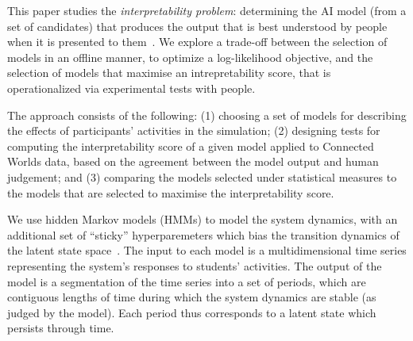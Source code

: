 \documentclass[letterpaper]{article} %
\newcommand{\kibitz}[2]{\ifnum\Comments=1{\textcolor{#1}{#2}}\fi}
\newcommand{\kg}[1]{\kibitz{red}{[KG:#1]}}
\begin{document}
This paper studies the \emph{interpretability problem}: determining the AI model (from a set of candidates) that produces the output that is  best understood by people when it is presented  to them~\cite{gilpin2018explaining,doshi2017roadmap,caruana2015intelligible}.
We explore a trade-off between the selection of models in an offline manner, to optimize a log-likelihood objective, and the selection of models that maximise an intrepretability score, that is operationalized via experimental tests with people.

The approach consists of the following:
(1) choosing a set of models for describing the effects of participants' activities in the simulation;
(2) designing tests for computing the interpretability score of a given model applied to Connected Worlds data, based on the agreement between the model output and human judgement; and
(3) comparing the models selected under statistical measures to the models that are selected to maximise the interpretability score.


We use hidden Markov models (HMMs) to model the system dynamics, with an additional set of ``sticky'' hyperparemeters which bias the transition dynamics of the latent state space~\cite{fox2008hdp}.
The input to each model is a multidimensional time series representing the system's responses to students' activities.
The output of the model is a segmentation of the time series into a set of periods, which are contiguous lengths of time during which the system
dynamics are stable (as judged by the model). Each period thus corresponds to a latent state which persists through time.
\end{document}
